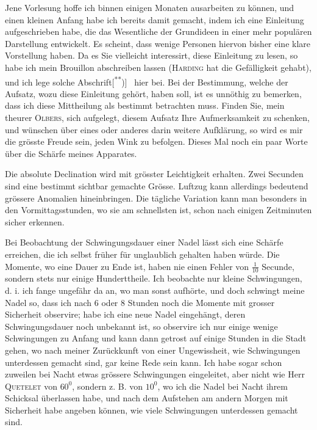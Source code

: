 Jene Vorlesung hoffe ich binnen einigen Monaten ausarbeiten zu können,
und einen kleinen Anfang habe ich bereits damit gemacht, indem ich eine
Einleitung aufgeschrieben habe, die das Wesentliche der Grundideen in einer
mehr populären Darstellung entwickelt. Es scheint, dass wenige Personen
hiervon bisher eine klare Vorstellung haben. Da es Sie vielleicht interessirt,
diese Einleitung zu lesen, so habe ich mein Brouillon abschreiben lassen
(\textsc{Harding} hat die Gefälligkeit gehabt), und ich lege solche Abschrift[\textsuperscript{**})]\begingroup\renewcommand{\thefootnote}{}
\endgroup\ hier
bei. Bei der Bestimmung, welche der Aufsatz, wozu diese Einleitung gehört,
haben soll, ist es unnöthig zu bemerken, dass ich diese Mittheilung als 
 bestimmt betrachten muss. Finden Sie, mein theurer \textsc{Olbers}, sich
aufgelegt, diesem Aufsatz Ihre Aufmerksamkeit zu schenken, und wünschen
über eines oder anderes darin weitere Aufklärung, so wird es mir die grösste
Freude sein, jeden Wink zu befolgen. Dieses Mal noch ein paar Worte über
die Schärfe meines Apparates.

Die absolute Declination wird mit grösster Leichtigkeit erhalten. Zwei
Secunden sind eine bestimmt sichtbar gemachte Grösse. Luftzug kann allerdings
bedeutend grössere Anomalien hineinbringen. Die tägliche Variation
kann man besonders in den Vormittagsstunden, wo sie am schnellsten ist,
schon nach einigen Zeitminuten sicher erkennen.

Bei Beobachtung der Schwingungsdauer einer Nadel lässt sich eine Schärfe
erreichen, die ich selbst früher für unglaublich gehalten haben würde. Die
Momente, wo eine Dauer zu Ende ist, haben nie einen Fehler von \(\frac{1}{10}\) Secunde,
sondern stets nur einige Hunderttheile. Ich beobachte nur kleine
Schwingungen, d. i. ich fange ungefähr da an, wo man sonst aufhörte, und
doch schwingt meine Nadel so, dass ich nach 6 oder 8 Stunden noch die
\clearpage{}
\noindent Momente mit grosser Sicherheit observire; habe ich eine neue Nadel eingehängt,
deren Schwingungsdauer noch unbekannt ist, so observire ich nur einige
wenige Schwingungen zu Anfang und kann dann getrost auf einige Stunden
in die Stadt gehen, wo nach meiner Zurückkunft von einer Ungewissheit,
wie  Schwingungen unterdessen gemacht sind, gar keine Rede sein kann.
Ich habe sogar schon zuweilen bei Nacht etwas grössere Schwingungen eingeleitet,
aber nicht wie Herr \textsc{Quetelet} von \(60^{0}\), sondern z. B. von \(10^{0}\), wo
ich die Nadel bei Nacht ihrem Schicksal überlassen habe, und nach dem
Aufstehen am andern Morgen mit Sicherheit habe angeben können, wie viele
Schwingungen unterdessen gemacht sind.

